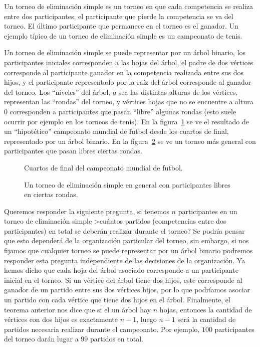 \begin{ejemplo}
  Un torneo de eliminación simple es un torneo en que cada competencia se realiza entre dos participantes, el participante que pierde la competencia se va del torneo.
  El último participante que permanece en el torneo es el ganador.
  Un ejemplo típico de un torneo de eliminación simple es un campeonato de tenis.
  
  Un torneo de eliminación simple se puede representar por un árbol binario, los participantes iniciales corresponden a las hojas del árbol, el padre de dos vértices corresponde al participante ganador en la competencia realizada entre sus dos hijos, y el participante representado por la raíz del árbol corresponde al ganador del torneo.
   Los ``niveles'' del árbol, o sea las distintas alturas de los vértices, representan las ``rondas'' del torneo, y vértices hojas que no se encuentre a altura $0$ corresponden a participantes que pasan ``libre'' algunas rondas (esto suele ocurrir por ejemplo en los torneos de tenis).
   En la figura~\ref{fig:world-cup-tournament} se ve el resultado de un ``hipotético'' campeonato mundial de futbol desde los cuartos de final, representado por un árbol binario.
   En la figura~\ref{fig:tournament} se ve un torneo más general con participantes que pasan libres ciertas rondas.
   
   \begin{figure}[t!]
   \centering
   \vspace*{200pt}
   \caption{Cuartos de final del campeonato mundial de futbol.}
   \label{fig:world-cup-tournament}
   \end{figure}
   \begin{figure}[h!]
   \centering
   \vspace*{200pt}
   \caption{Un torneo de eliminación simple en general con participantes libres en ciertas rondas.}
   \label{fig:tournament}
   \end{figure}
   
   Queremos responder la siguiente pregunta, si tenemos $n$ participantes en un torneo de eliminación simple >cuántos partidos (competencias entre dos participantes) en total se deberán realizar durante el torneo?
   Se podría pensar que esto dependerá de la organización particular del torneo, sin embargo, si nos fijamos que cualquier torneo se puede representar por un árbol binario podremos responder esta pregunta independiente de las decisiones de la organización.
   Ya hemos dicho que cada hoja del árbol asociado corresponde a un participante inicial en el torneo.
   Si un vértice del árbol tiene dos hijos, este corresponde al ganador de un partido entre sus dos vértices hijos, por lo que podríamos asociar un partido con cada vértice que tiene dos hijos en el árbol.
   Finalmente, el teorema anterior nos dice que si el un árbol hay $n$ hojas, entonces la cantidad de vértices con dos hijos es exactamente $n-1$, luego $n-1$ será la cantidad de partidos necesaria realizar durante el campeonato.
   Por ejemplo, $100$ participantes del torneo darán lugar a $99$ partidos en total.
\end{ejemplo}

